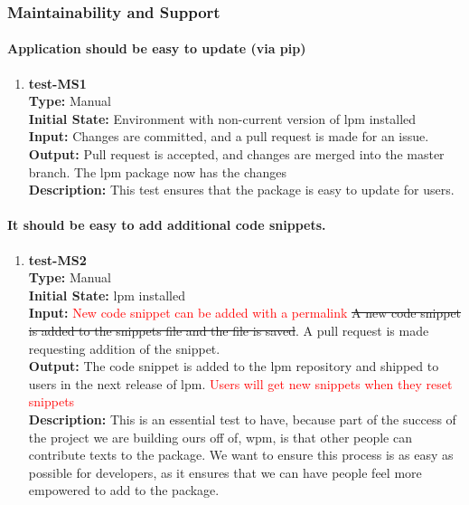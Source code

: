 \documentclass[12pt, titlepage]{article}
\begin{document}
\subsubsection{Maintainability and Support}
\paragraph{Application should be easy to update (via pip)}
\begin{enumerate}
    \item{\textbf{test-MS1}\\}
    \textbf{Type:} Manual\\
    \textbf{Initial State:} Environment with non-current version of lpm installed\\
    \textbf{Input:} Changes are committed, and a pull request is made for an issue.\\
    \textbf{Output:} Pull request is accepted, and changes are merged into the master branch. The lpm package now has the changes\\
    \textbf{Description:} This test ensures that the package is easy to update for users.\\
\end{enumerate}

\paragraph{ It should be easy to add additional code snippets.}
\begin{enumerate}
    \item{\textbf{test-MS2}\\}
    \textbf{Type:} Manual\\
    \textbf{Initial State:} lpm installed\\
    \textbf{Input:} \textcolor{red}{New code snippet can be added with a permalink} \sout{A new code snippet is added to the snippets file and the file is saved}. A pull request is made requesting addition of the snippet.\\
    \textbf{Output:} The code snippet is added to the lpm repository and shipped to users in the next release of lpm. \textcolor{red}{Users will get new snippets when they reset snippets}\\
    \textbf{Description:} This is an essential test to have, because part of the success of the project we are building ours off of, wpm, is that other people can contribute texts to the package. We want to ensure this process is as easy as possible for developers, as it ensures that we can have people feel more empowered to add to the package. \\
\end{enumerate}
\end{document}
